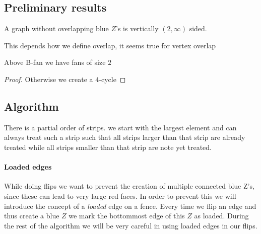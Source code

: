\subsection{Preliminary results}

\begin{lemma}
  \label{lm:}
  A graph without overlapping blue $Z$'s is vertically $(2, \infty)$ sided.
\end{lemma}
This depends how we define overlap, it seems true for vertex overlap

\begin{lemma}
  \label{lm:}
  Above B-fan we have fans of size $2$
\end{lemma}
\begin{proof}
  Otherwise we create a $4$-cycle
\end{proof}


\subsection{Algorithm}
There is a partial order of strips. we start with the largest element and can always treat such a strip such that all strips larger than that strip are already treated while all strips smaller than that strip are note yet treated.

\paragraph{Loaded edges}
While doing flips we want to prevent the creation of multiple connected blue Z's, since these can lead to very large red faces. In order to prevent this we will introduce the concept of a \emph{loaded} edge on a fence. Every time we flip an edge and thus create a blue $Z$ we mark the bottommost edge of this $Z$ as loaded. During the rest of the algorithm we will be very careful in using loaded edges in our flips.

